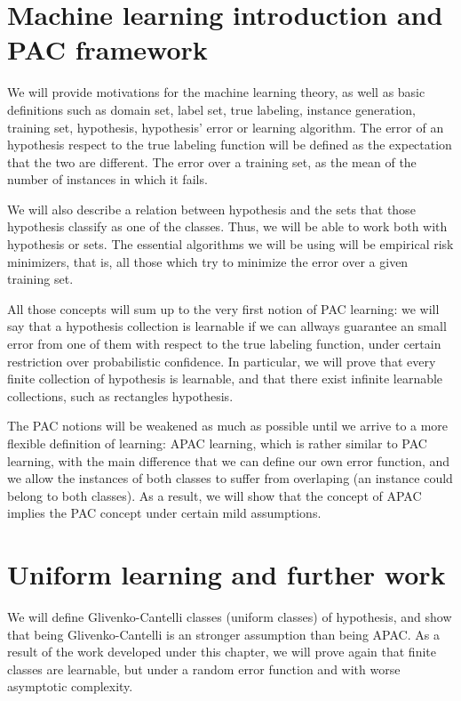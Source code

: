 \section*{Machine learning introduction and PAC framework}
We will provide motivations for the machine learning theory, as well as basic definitions such as domain set, label set, 
true labeling, instance generation, training set, hypothesis, hypothesis' error or learning algorithm. The error of an
hypothesis respect to the true labeling function will be defined as the expectation that the two are different. The error over
a training set, as the mean of the number of instances in which it fails.

We will also describe a relation between hypothesis and the sets that those hypothesis classify as one of the classes. Thus,
we will be able to work both with hypothesis or sets. The essential algorithms we will be using will be empirical risk 
minimizers, that is, all those which try to minimize the error over a given training set.

All those concepts will sum up to the very first notion of PAC learning: we will say that a hypothesis collection is 
learnable if we can allways guarantee an small error from one of them with respect to the true labeling function, under
certain restriction over probabilistic confidence. In particular, we will prove that every finite collection of hypothesis
is learnable, and that there exist infinite learnable collections, such as rectangles hypothesis.

The PAC notions will be weakened as much as possible until we arrive to a more flexible definition of learning: APAC 
learning, which is rather similar to PAC learning, with the main difference that we can define our own error function,
and we allow the instances of both classes to suffer from overlaping (an instance could belong to both classes). As
a result, we will show that the concept of APAC implies the PAC concept under certain mild assumptions.


\section*{Uniform learning and further work}

We will define Glivenko-Cantelli classes (uniform classes) of hypothesis, and show that being Glivenko-Cantelli is an
stronger assumption than being APAC. As a result of the work developed under this chapter, we will prove again that finite
classes are learnable, but under a random error function and with worse asymptotic complexity.

